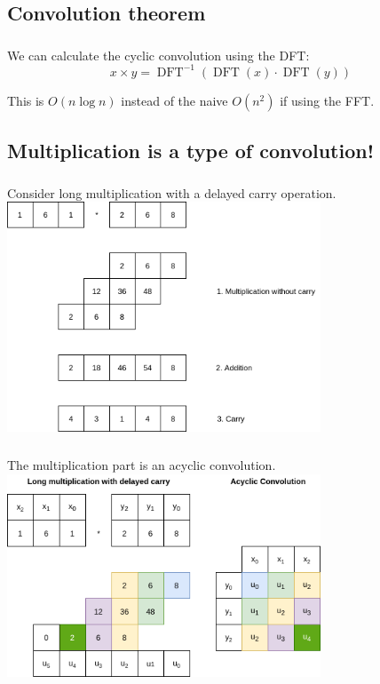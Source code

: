 \documentclass{beamer}
\DeclareMathOperator{\DFT}{DFT}
\begin{document}
\subsection{Convolution theorem}

\begin{frame}
		\frametitle{\secname}
		\framesubtitle{\subsecname}


		We can calculate the cyclic convolution using the DFT:
		\[
				x \times y = \DFT^{-1}(\DFT(x) \cdot \DFT(y))
		\]


		This is $O(n \log n)$ instead of the naive $O(n^2)$ if using the FFT.
\end{frame}

\subsection{Multiplication is a type of convolution!}

\begin{frame}
		\frametitle{\secname}
		\framesubtitle{\subsecname}


		Consider long multiplication with a delayed carry operation.
		\includegraphics[width=0.7\textwidth]{../resources/long_multiplication.drawio.png}
\end{frame}

\begin{frame}
		\frametitle{\secname}
		\framesubtitle{\subsecname}

		The multiplication part is an acyclic convolution.
		\includegraphics[width=0.7\textwidth]{../resources/multiplication_convolution.drawio.png}
\end{frame}
\end{document}
